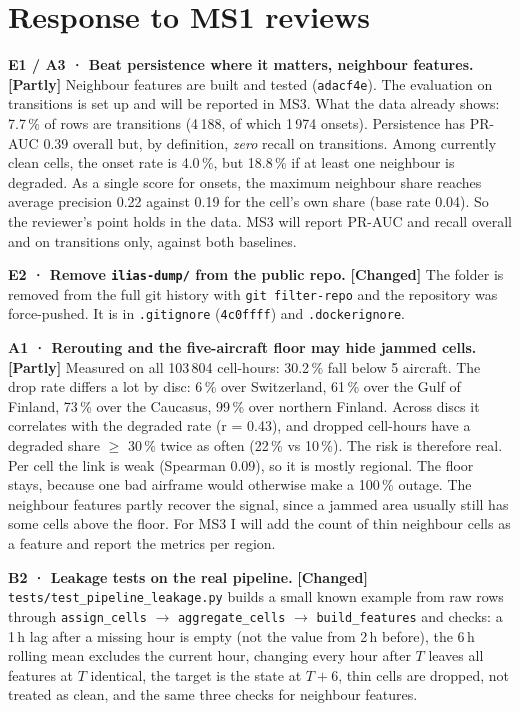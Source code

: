 \documentclass[10pt,a4paper]{article}
\newcommand{\code}[1]{\texttt{#1}}
\newcommand{\st}[1]{\textbf{[#1]}}
\begin{document}
\section{Response to MS1 reviews}

\textbf{E1 / A3 · Beat persistence where it matters, neighbour features.}
\st{Partly} Neighbour features are built and tested (\code{adacf4e}). The evaluation on
transitions is set up and will be reported in MS3. What the data already shows: 7.7\,\%
of rows are transitions (4\,188, of which 1\,974 onsets). Persistence has PR-AUC 0.39
overall but, by definition, \emph{zero} recall on transitions. Among currently clean
cells, the onset rate is 4.0\,\%, but 18.8\,\% if at least one neighbour is degraded. As a
single score for onsets, the maximum neighbour share reaches average precision 0.22 against
0.19 for the cell's own share (base rate 0.04). So the reviewer's point holds in the data.
MS3 will report PR-AUC and recall overall and on transitions only, against both baselines.

\textbf{E2 · Remove \code{ilias-dump/} from the public repo.} \st{Changed} The folder
is removed from the full git history with \code{git filter-repo} and the repository was
force-pushed. It is in \code{.gitignore} (\code{4c0ffff}) and \code{.dockerignore}.

\textbf{A1 · Rerouting and the five-aircraft floor may hide jammed cells.}
\st{Partly} Measured on all 103\,804 cell-hours: 30.2\,\% fall below 5 aircraft. The drop
rate differs a lot by disc: 6\,\% over Switzerland, 61\,\% over the Gulf of Finland,
73\,\% over the Caucasus, 99\,\% over northern Finland. Across discs it correlates with the
degraded rate (r = 0.43), and dropped cell-hours have a degraded share $\geq$ 30\,\% twice
as often (22\,\% vs 10\,\%). The risk is therefore real. Per cell the link is weak
(Spearman 0.09), so it is mostly regional. The floor stays, because one bad airframe would
otherwise make a 100\,\% outage. The neighbour features partly recover the signal, since
a jammed area usually still has some cells above the floor. For MS3 I will add the count
of thin neighbour cells as a feature and report the metrics per region.

\textbf{B2 · Leakage tests on the real pipeline.} \st{Changed}
\code{tests/test\_pipeline\_leakage.py} builds a small known example from raw rows through
\code{assign\_cells} $\rightarrow$ \code{aggregate\_cells} $\rightarrow$
\code{build\_features} and checks: a 1\,h lag after a missing hour is empty (not the value
from 2\,h before), the 6\,h rolling mean excludes the current hour, changing every hour
after $T$ leaves all features at $T$ identical, the target is the state at $T+6$, thin
cells are dropped, not treated as clean, and the same three checks for neighbour features.
\end{document}
